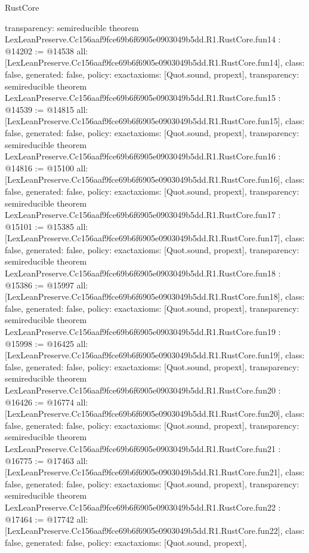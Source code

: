\begin{lexlean}{RustCore}
\begin{coremodule}
{  transparency: semireducible
}
theorem LexLeanPreserve.Cc156aaf9fce69b6f6905e0903049b5dd.R1.RustCore.fun14 : @14202 := @14538 {
  all: [LexLeanPreserve.Cc156aaf9fce69b6f6905e0903049b5dd.R1.RustCore.fun14],
  class: false,
  generated: false,
  policy: exact{axioms: [Quot.sound, propext]},
  transparency: semireducible
}
theorem LexLeanPreserve.Cc156aaf9fce69b6f6905e0903049b5dd.R1.RustCore.fun15 : @14539 := @14815 {
  all: [LexLeanPreserve.Cc156aaf9fce69b6f6905e0903049b5dd.R1.RustCore.fun15],
  class: false,
  generated: false,
  policy: exact{axioms: [Quot.sound, propext]},
  transparency: semireducible
}
theorem LexLeanPreserve.Cc156aaf9fce69b6f6905e0903049b5dd.R1.RustCore.fun16 : @14816 := @15100 {
  all: [LexLeanPreserve.Cc156aaf9fce69b6f6905e0903049b5dd.R1.RustCore.fun16],
  class: false,
  generated: false,
  policy: exact{axioms: [Quot.sound, propext]},
  transparency: semireducible
}
theorem LexLeanPreserve.Cc156aaf9fce69b6f6905e0903049b5dd.R1.RustCore.fun17 : @15101 := @15385 {
  all: [LexLeanPreserve.Cc156aaf9fce69b6f6905e0903049b5dd.R1.RustCore.fun17],
  class: false,
  generated: false,
  policy: exact{axioms: [Quot.sound, propext]},
  transparency: semireducible
}
theorem LexLeanPreserve.Cc156aaf9fce69b6f6905e0903049b5dd.R1.RustCore.fun18 : @15386 := @15997 {
  all: [LexLeanPreserve.Cc156aaf9fce69b6f6905e0903049b5dd.R1.RustCore.fun18],
  class: false,
  generated: false,
  policy: exact{axioms: [Quot.sound, propext]},
  transparency: semireducible
}
theorem LexLeanPreserve.Cc156aaf9fce69b6f6905e0903049b5dd.R1.RustCore.fun19 : @15998 := @16425 {
  all: [LexLeanPreserve.Cc156aaf9fce69b6f6905e0903049b5dd.R1.RustCore.fun19],
  class: false,
  generated: false,
  policy: exact{axioms: [Quot.sound, propext]},
  transparency: semireducible
}
theorem LexLeanPreserve.Cc156aaf9fce69b6f6905e0903049b5dd.R1.RustCore.fun20 : @16426 := @16774 {
  all: [LexLeanPreserve.Cc156aaf9fce69b6f6905e0903049b5dd.R1.RustCore.fun20],
  class: false,
  generated: false,
  policy: exact{axioms: [Quot.sound, propext]},
  transparency: semireducible
}
theorem LexLeanPreserve.Cc156aaf9fce69b6f6905e0903049b5dd.R1.RustCore.fun21 : @16775 := @17463 {
  all: [LexLeanPreserve.Cc156aaf9fce69b6f6905e0903049b5dd.R1.RustCore.fun21],
  class: false,
  generated: false,
  policy: exact{axioms: [Quot.sound, propext]},
  transparency: semireducible
}
theorem LexLeanPreserve.Cc156aaf9fce69b6f6905e0903049b5dd.R1.RustCore.fun22 : @17464 := @17742 {
  all: [LexLeanPreserve.Cc156aaf9fce69b6f6905e0903049b5dd.R1.RustCore.fun22],
  class: false,
  generated: false,
  policy: exact{axioms: [Quot.sound, propext]},
}
\end{coremodule}
\end{lexlean}
